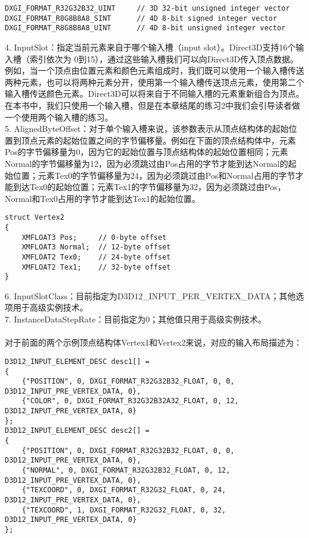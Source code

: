 \begin{flushleft}
\begin{lstlisting}
DXGI_FORMAT_R32G32B32_UINT     // 3D 32-bit unsigned integer vector
DXGI_FORMAT_R8G8B8A8_SINT      // 4D 8-bit signed integer vector
DXGI_FORMAT_R8G8B8A8_UINT      // 4D 8-bit unsigned integer vector
\end{lstlisting}
4. InputSlot：指定当前元素来自于哪个输入槽（input slot）。Direct3D支持16个输入槽（索引依次为 0到15），通过这些输入槽我们可以向Direct3D传入顶点数据。例如，当一个顶点由位置元素和颜色元素组成时，我们既可以使用一个输入槽传送两种元素，也可以将两种元素分开，使用第一个输入槽传送顶点元素，使用第二个输入槽传送颜色元素。Direct3D可以将来自于不同输入槽的元素重新组合为顶点。在本书中，我们只使用一个输入槽，但是在本章结尾的练习2中我们会引导读者做一个使用两个输入槽的练习。\\
5. AlignedByteOffset：对于单个输入槽来说，该参数表示从顶点结构体的起始位置到顶点元素的起始位置之间的字节偏移量。例如在下面的顶点结构体中，元素Pos的字节偏移量为0，因为它的起始位置与顶点结构体的起始位置相同；元素Normal的字节偏移量为12，因为必须跳过由Pos占用的字节才能到达Normal的起始位置；元素Tex0的字节偏移量为24，因为必须跳过由Pos和Normal占用的字节才能到达Tex0的起始位置；元素Tex1的字节偏移量为32，因为必须跳过由Pos，Normal和Tex0占用的字节才能到达Tex1的起始位置。\\
\begin{lstlisting}
struct Vertex2
{
    XMFLOAT3 Pos;     // 0-byte offset
    XMFLOAT3 Normal;  // 12-byte offset
    XMFLOAT2 Tex0;    // 24-byte offset
    XMFLOAT2 Tex1;    // 32-byte offset
}
\end{lstlisting}
6. InputSlotClass：目前指定为D3D12\_INPUT\_PER\_VERTEX\_DATA；其他选项用于高级实例技术。\\
7. InstanceDataStepRate：目前指定为0；其他值只用于高级实例技术。\\
~\\
对于前面的两个示例顶点结构体Vertex1和Vertex2来说，对应的输入布局描述为：
\begin{lstlisting}
D3D12_INPUT_ELEMENT_DESC desc1[] = 
{
    {"POSITION", 0, DXGI_FORMAT_R32G32B32_FLOAT, 0, 0, D3D12_INPUT_PRE_VERTEX_DATA, 0},
    {"COLOR", 0, DXGI_FORMAT_R32G32B32A32_FLOAT, 0, 12, D3D12_INPUT_PRE_VERTEX_DATA, 0}
};
D3D12_INPUT_ELEMENT_DESC desc2[] =
{
    {"POSITION", 0, DXGI_FORMAT_R32G32B32_FLOAT, 0, 0,  D3D12_INPUT_PRE_VERTEX_DATA, 0},
    {"NORMAL", 0, DXGI_FORMAT_R32G32B32_FLOAT, 0, 12, D3D12_INPUT_PRE_VERTEX_DATA, 0},
    {"TEXCOORD", 0, DXGI_FORMAT_R32G32_FLOAT, 0, 24, D3D12_INPUT_PRE_VERTEX_DATA, 0},
    {"TEXCOORD", 1, DXGI_FORMAT_R32G32_FLOAT, 0, 32, D3D12_INPUT_PRE_VERTEX_DATA, 0}
};
\end{lstlisting}
\end{flushleft}
